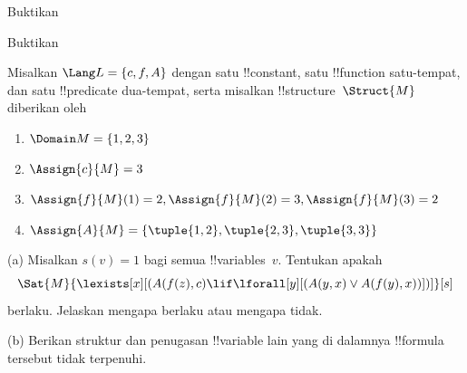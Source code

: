 \documentclass[../../../include/open-logic-section]{subfiles}
\begin{document}

\begin{prob}
  Buktikan 
\end{prob}
\tagendprob


\begin{prob}
  Buktikan 
\end{prob}
\tagendprob

\begin{prob}
Misalkan $\Lang L = \{c, f, A\}$ dengan satu !!{constant}, satu
!!{function} satu-tempat, dan satu !!{predicate} dua-tempat, serta misalkan
!!{structure}~$\Struct{M}$ diberikan oleh
\begin{enumerate}
\item $\Domain M = \{1, 2, 3\}$
\item $\Assign{c}{M} = 3$
\item $\Assign{f}{M}(1) = 2, \Assign{f}{M}(2) = 3, \Assign{f}{M}(3) = 2$
\item $\Assign{A}{M} = \{\tuple{1, 2}, \tuple{2, 3}, \tuple{3, 3}\}$
\end{enumerate}
(a) Misalkan $s(v) = 1$ bagi semua !!{variable}s~$v$. Tentukan apakah
\[
\Sat{M}{\lexists[x][(A(f(z), c) \lif \lforall[y][(A(y, x) \lor A(f(y),
      x))])]}[s]
\]
berlaku. Jelaskan mengapa berlaku atau mengapa tidak.

(b) Berikan struktur dan penugasan !!{variable} lain yang di dalamnya
!!{formula} tersebut tidak terpenuhi.
\end{prob}
\end{document}
